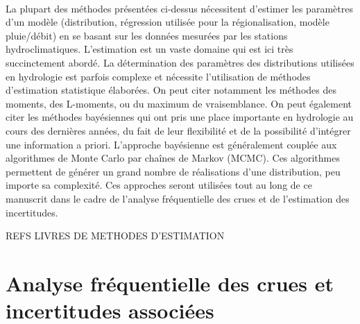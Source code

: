 \documentclass[11pt]{article}
\begin{document}
	\paragraph{} La plupart des méthodes présentées ci-dessus nécessitent d'estimer les paramètres d'un modèle (distribution, régression utilisée pour la régionalisation, modèle pluie/débit) en se basant sur les données mesurées par les stations hydroclimatiques. L'estimation est un vaste domaine qui est ici très succinctement abordé. La détermination des paramètres des distributions utilisées en hydrologie est parfois complexe et nécessite l'utilisation de méthodes d'estimation statistique élaborées. On peut citer notamment les méthodes des moments, des L-moments, ou du maximum de vraisemblance. On peut également citer les méthodes bayésiennes qui ont pris une place importante en hydrologie au cours des dernières années, du fait de leur flexibilité et de la possibilité d'intégrer une information a priori. L'approche bayésienne est généralement couplée aux algorithmes de Monte Carlo par chaînes de Markov (MCMC). Ces algorithmes permettent de générer un grand nombre de réalisations d'une distribution, peu importe sa complexité. Ces approches seront utilisées tout au long de ce manuscrit dans le cadre de l'analyse fréquentielle des crues et de l'estimation des incertitudes. 	
	
	REFS LIVRES DE METHODES D'ESTIMATION
	
	\section{Analyse fréquentielle des crues et incertitudes associées}
	
\end{document}
